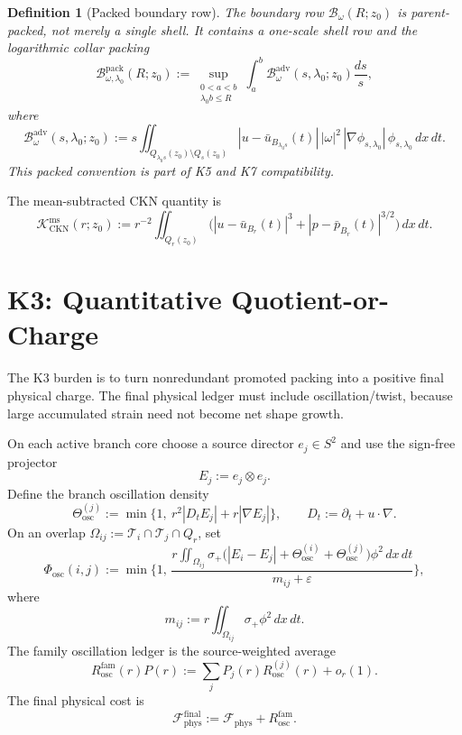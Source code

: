 \documentclass[11pt]{article}
\newtheorem{definition}{Definition}
\begin{document}
\begin{definition}[Packed boundary row]
\label{def:packed-boundary}
The boundary row \(\mathcal B_\omega(R;z_0)\) is parent-packed, not merely a
single shell.  It contains a one-scale shell row and the logarithmic collar
packing
\[
\mathcal B_{\omega,\lambda_0}^{\mathrm{pack}}(R;z_0)
:=
\sup_{\substack{0<a<b\\ \lambda_0b\le R}}
\int_a^b
\mathcal B_\omega^{\mathrm{adv}}(s,\lambda_0;z_0)\frac{ds}{s},
\]
where
\[
\mathcal B_\omega^{\mathrm{adv}}(s,\lambda_0;z_0)
:=
s\iint_{Q_{\lambda_0s}(z_0)\setminus Q_s(z_0)}
|u-\bar u_{B_{\lambda_0s}}(t)|\,|\omega|^2\,
|\nabla\phi_{s,\lambda_0}|\,\phi_{s,\lambda_0}\,dx\,dt .
\]
This packed convention is part of K5 and K7 compatibility.
\end{definition}

The mean-subtracted CKN quantity is
\begin{equation}
\label{eq:Kms}
\mathcal K_{\mathrm{CKN}}^{\mathrm{ms}}(r;z_0)
:=
r^{-2}\iint_{Q_r(z_0)}
\Big(|u-\bar u_{B_r}(t)|^3
+|p-\bar p_{B_r}(t)|^{3/2}\Big)\,dx\,dt .
\end{equation}

\clearpage
\section{K3: Quantitative Quotient-or-Charge}
\label{sec:K3}

The K3 burden is to turn nonredundant promoted packing into a positive final
physical charge.  The final physical ledger must include oscillation/twist,
because large accumulated strain need not become net shape growth.

On each active branch core choose a source director \(e_j\in S^2\) and use the
sign-free projector
\[
E_j:=e_j\otimes e_j .
\]
Define the branch oscillation density
\begin{equation}
\label{eq:theta-osc}
\Theta_{\mathrm{osc}}^{(j)}
:=
\min\{1,\ r^2|D_tE_j|+r|\nabla E_j|\},
\qquad
D_t:=\partial_t+u\cdot\nabla .
\end{equation}
On an overlap \(\Omega_{ij}:=\mathcal T_i\cap\mathcal T_j\cap Q_r\), set
\begin{equation}
\label{eq:Phi-osc}
\Phi_{\mathrm{osc}}(i,j)
:=
\min\Bigg\{1,\,
\frac{
r\iint_{\Omega_{ij}}\sigma_+
\big(|E_i-E_j|+\Theta_{\mathrm{osc}}^{(i)}
+\Theta_{\mathrm{osc}}^{(j)}\big)\phi^2\,dx\,dt
}{
m_{ij}+\varepsilon
}\Bigg\},
\end{equation}
where
\[
m_{ij}:=r\iint_{\Omega_{ij}}\sigma_+\phi^2\,dx\,dt.
\]
The family oscillation ledger is the source-weighted average
\begin{equation}
\label{eq:Rosc-family}
R_{\mathrm{osc}}^{\mathrm{fam}}(r)P(r)
:=
\sum_{j}P_j(r)R_{\mathrm{osc}}^{(j)}(r)+o_r(1).
\end{equation}
The final physical cost is
\begin{equation}
\label{eq:Fphys-final}
\mathcal F_{\mathrm{phys}}^{\mathrm{final}}
:=
\mathcal F_{\mathrm{phys}}+R_{\mathrm{osc}}^{\mathrm{fam}}.
\end{equation}
\end{document}
